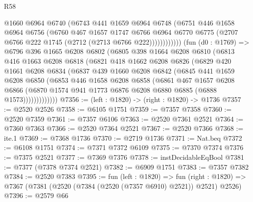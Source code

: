 \begin{lexlean}{R58}
\begin{coremodule}
                    @1660
                    @6964
                    @6740
                    (@6743
                      @441
                      @1659
                      @6964
                      @6748
                      (@6751
                        @446
                        @1658
                        @6964
                        @6756
                        (@6760
                          @467
                          @1657
                          @1747
                          @6766
                          @6964
                          @6770
                          @6775
                          (@2707 @6766 @222 @1745 (@2712 (@2713 @6766 @222))))))))))))
        (fun (d0 : @1769) =>
        @6796
          @396
          @1665
          @6208
          @6802
          (@6805
            @398
            @1664
            @6208
            @6810
            (@6813
              @416
              @1663
              @6208
              @6818
              (@6821
                @418
                @1662
                @6208
                @6826
                (@6829
                  @420
                  @1661
                  @6208
                  @6834
                  (@6837
                    @439
                    @1660
                    @6208
                    @6842
                    (@6845
                      @441
                      @1659
                      @6208
                      @6850
                      (@6853
                        @446
                        @1658
                        @6208
                        @6858
                        (@6861
                          @467
                          @1657
                          @6208
                          @6866
                          (@6870 @1574 @941 @1773 @6876 @6208 @6880 @6885 (@6888 @1573)))))))))))))
@7356 := (left : @1820) -> (right : @1820) -> @1736
@7357 := @2520 @2526
@7358 := @6105 @1751
@7359 := @7357 @7358
@7360 := @2520 @7359
@7361 := @7357 @6106
@7363 := @2520 @7361 @2521
@7364 := @7360 @7363
@7366 := @2520 @7364 @2521
@7367 := @2520 @7366
@7368 := ite.{1}
@7369 := @7368 @1736
@7370 := @2719 @1736
@7371 := Nat.beq
@7372 := @6108 @1751
@7374 := @7371 @7372 @6109
@7375 := @7370 @7374
@7376 := @7375 @2521
@7377 := @7369 @7376
@7378 := instDecidableEqBool
@7381 := @7377 (@7378 @7374 @2521)
@7382 := @6909 @1751
@7383 := @7357 @7382
@7384 := @2520 @7383
@7395 := fun (left : @1820) =>
  fun (right : @1820) => @7367 (@7381 (@2520 (@7384 (@2520 (@7357 @6910) @2521)) @2521) @2526)
@7396 := @2579 @66

\end{coremodule}
\end{lexlean}
